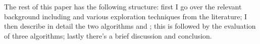 The rest of this paper has the following structure: first I go over the relevant background including \awa and various exploration techniques from the literature; I then describe in detail the two algorithms \eawa and \ebawa; this is followed by the evaluation of three algorithms; lastly there's a brief discussion and conclusion.

